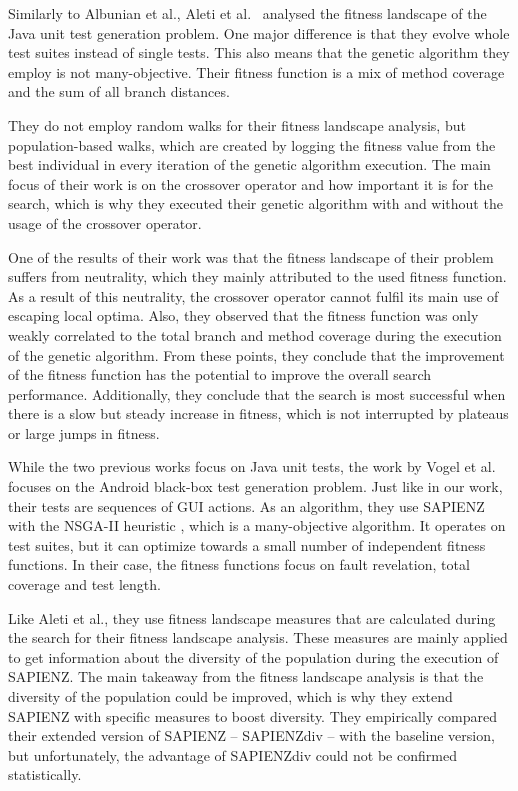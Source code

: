 \documentclass[
  a4paper,  %
  twoside,  %
  bibliography=totoc,
  headsepline,
  cleardoublepage=empty,
  parskip=half,
  draft=false
]{scrbook}
\begin{document}
Similarly to Albunian et al., Aleti et al.~\cite{aleti2017analysing} analysed the fitness landscape of the Java unit test generation problem. 
One major difference is that they evolve whole test suites instead of single tests.
This also means that the genetic algorithm they employ is not many-objective.
Their fitness function is a mix of method coverage and the sum of all branch distances.

They do not employ random walks for their fitness landscape analysis, but population-based walks, which are created by logging the fitness value from the best individual in every iteration of the genetic algorithm execution.
The main focus of their work is on the crossover operator and how important it is for the search, which is why they executed their genetic algorithm with and without the usage of the crossover operator.

One of the results of their work was that the fitness landscape of their problem suffers from neutrality, which they mainly attributed to the used fitness function.
As a result of this neutrality, the crossover operator cannot fulfil its main use of escaping local optima.
Also, they observed that the fitness function was only weakly correlated to the total branch and method coverage during the execution of the genetic algorithm.
From these points, they conclude that the improvement of the fitness function has the potential to improve the overall search performance.
Additionally, they conclude that the search is most successful when there is a slow but steady increase in fitness, which is not interrupted by plateaus or large jumps in fitness.

While the two previous works focus on Java unit tests, the work by Vogel et al.~\cite{vogel2019does} focuses on the Android black-box test generation problem.
Just like in our work, their tests are sequences of GUI actions.
As an algorithm, they use SAPIENZ \cite{mao2016sapienz} with the NSGA-II heuristic \cite{deb2002fast}, which is a many-objective algorithm.
It operates on test suites, but it can optimize towards a small number of independent fitness functions.
In their case, the fitness functions focus on fault revelation, total coverage and test length.

Like Aleti et al., they use fitness landscape measures that are calculated during the search for their fitness landscape analysis.
These measures are mainly applied to get information about the diversity of the population during the execution of SAPIENZ.
The main takeaway from the fitness landscape analysis is that the diversity of the population could be improved, which is why they extend SAPIENZ with specific measures to boost diversity.
They empirically compared their extended version of SAPIENZ -- SAPIENZdiv -- with the baseline version, but unfortunately, the advantage of SAPIENZdiv could not be confirmed statistically.
\end{document}
